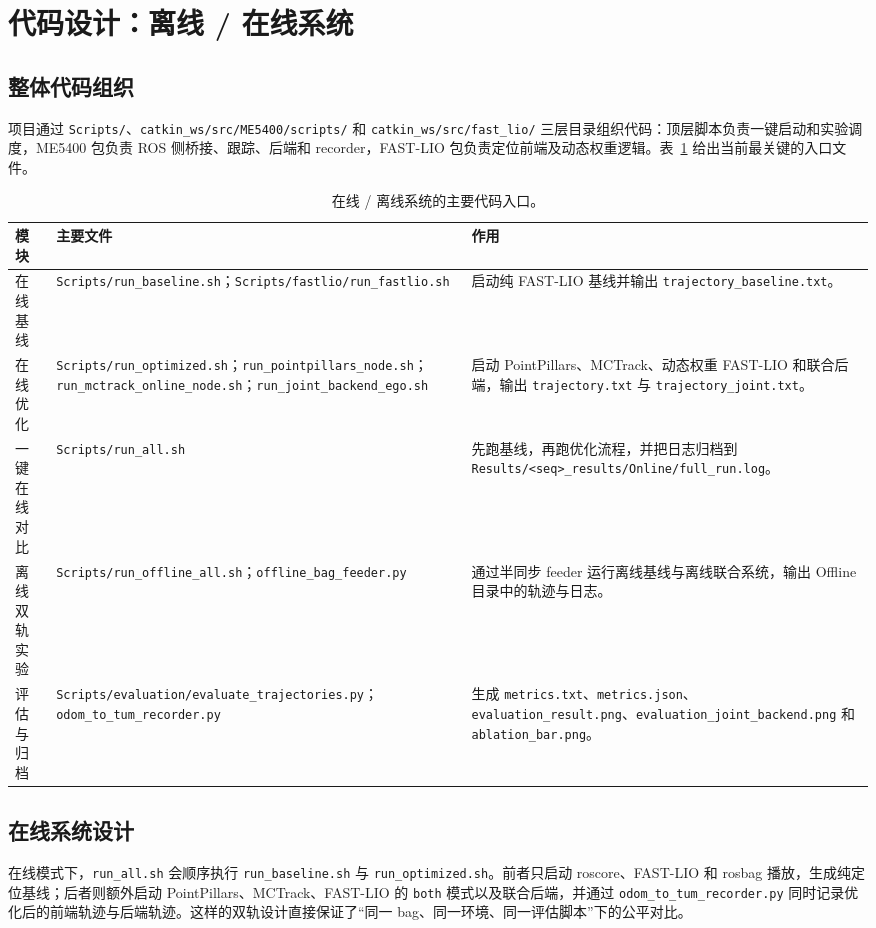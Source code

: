 \documentclass[UTF8,a4paper,12pt]{ctexart}
\begin{document}
\section{代码设计：离线 / 在线系统}
\subsection{整体代码组织}
项目通过 \texttt{Scripts/}、\texttt{catkin\_ws/src/ME5400/scripts/} 和 \texttt{catkin\_ws/src/fast\_lio/} 三层目录组织代码：顶层脚本负责一键启动和实验调度，ME5400 包负责 ROS 侧桥接、跟踪、后端和 recorder，FAST-LIO 包负责定位前端及动态权重逻辑。表~\ref{tab:code_design} 给出当前最关键的入口文件。

\begin{table}[H]
    \centering
    \caption{在线 / 离线系统的主要代码入口。}
    \label{tab:code_design}
    \begin{tabularx}{\textwidth}{p{2.3cm} p{4.2cm} X}
        \toprule
        模块 & 主要文件 & 作用 \\
        \midrule
        在线基线 & \texttt{Scripts/run\_baseline.sh}；\texttt{Scripts/fastlio/run\_fastlio.sh} & 启动纯 FAST-LIO 基线并输出 \texttt{trajectory\_baseline.txt}。 \\
        在线优化 & \texttt{Scripts/run\_optimized.sh}；\texttt{run\_pointpillars\_node.sh}；\texttt{run\_mctrack\_online\_node.sh}；\texttt{run\_joint\_backend\_ego.sh} & 启动 PointPillars、MCTrack、动态权重 FAST-LIO 和联合后端，输出 \texttt{trajectory.txt} 与 \texttt{trajectory\_joint.txt}。 \\
        一键在线对比 & \texttt{Scripts/run\_all.sh} & 先跑基线，再跑优化流程，并把日志归档到 \texttt{Results/<seq>\_results/Online/full\_run.log}。 \\
        离线双轨实验 & \texttt{Scripts/run\_offline\_all.sh}；\texttt{offline\_bag\_feeder.py} & 通过半同步 feeder 运行离线基线与离线联合系统，输出 Offline 目录中的轨迹与日志。 \\
        评估与归档 & \texttt{Scripts/evaluation/evaluate\_trajectories.py}；\texttt{odom\_to\_tum\_recorder.py} & 生成 \texttt{metrics.txt}、\texttt{metrics.json}、\texttt{evaluation\_result.png}、\texttt{evaluation\_joint\_backend.png} 和 \texttt{ablation\_bar.png}。 \\
        \bottomrule
    \end{tabularx}
\end{table}

\subsection{在线系统设计}
在线模式下，\texttt{run\_all.sh} 会顺序执行 \texttt{run\_baseline.sh} 与 \texttt{run\_optimized.sh}。前者只启动 roscore、FAST-LIO 和 rosbag 播放，生成纯定位基线；后者则额外启动 PointPillars、MCTrack、FAST-LIO 的 \texttt{both} 模式以及联合后端，并通过 \texttt{odom\_to\_tum\_recorder.py} 同时记录优化后的前端轨迹与后端轨迹。这样的双轨设计直接保证了“同一 bag、同一环境、同一评估脚本”下的公平对比。
\end{document}
